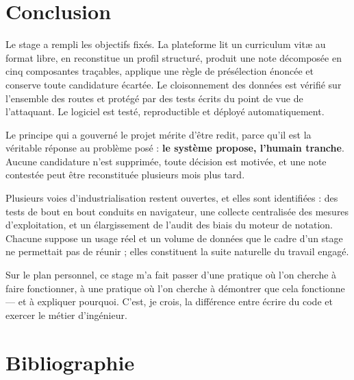 \documentclass[12pt,a4paper]{report}
\begin{document}
\chapter*{Conclusion}

Le stage a rempli les objectifs fixés. La plateforme lit un curriculum vitæ au
format libre, en reconstitue un profil structuré, produit une note décomposée
en cinq composantes traçables, applique une règle de présélection énoncée et
conserve toute candidature écartée. Le cloisonnement des données est vérifié
sur l'ensemble des routes et protégé par des tests écrits du point de vue de
l'attaquant. Le logiciel est testé, reproductible et déployé automatiquement.

Le principe qui a gouverné le projet mérite d'être redit, parce qu'il est la
véritable réponse au problème posé : \textbf{le système propose, l'humain
tranche}. Aucune candidature n'est supprimée, toute décision est motivée, et
une note contestée peut être reconstituée plusieurs mois plus tard.

Plusieurs voies d'industrialisation restent ouvertes, et elles sont
identifiées : des tests de bout en bout conduits en navigateur, une collecte
centralisée des mesures d'exploitation, et un élargissement de l'audit des
biais du moteur de notation. Chacune suppose un usage réel et un volume de
données que le cadre d'un stage ne permettait pas de réunir ; elles
constituent la suite naturelle du travail engagé.

Sur le plan personnel, ce stage m'a fait passer d'une pratique où l'on cherche
à faire fonctionner, à une pratique où l'on cherche à démontrer que cela
fonctionne --- et à expliquer pourquoi. C'est, je crois, la différence entre
écrire du code et exercer le métier d'ingénieur.

\chapter*{Bibliographie}
\end{document}
